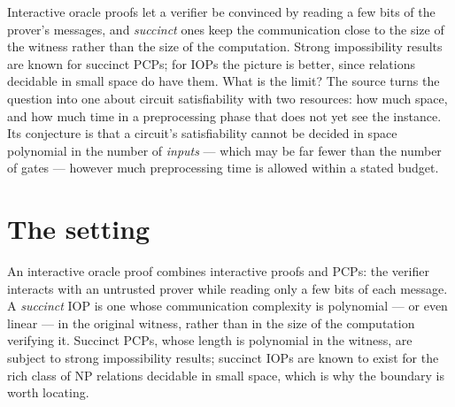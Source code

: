 \documentclass{conjura-conjecture}
\begin{document}

\vspace{0.4em}

\begin{informalconjecture}
Interactive oracle proofs let a verifier be convinced by reading a few
bits of the prover's messages, and \emph{succinct} ones keep the
communication close to the size of the witness rather than the size of
the computation. Strong impossibility results are known for succinct
PCPs; for IOPs the picture is better, since relations decidable in small
space do have them. What is the limit? The source turns the question into
one about circuit satisfiability with two resources: how much space, and
how much time in a preprocessing phase that does not yet see the
instance. Its conjecture is that a circuit's satisfiability cannot be
decided in space polynomial in the number of \emph{inputs} --- which may be
far fewer than the number of gates --- however much preprocessing time is
allowed within a stated budget.
\end{informalconjecture}

\section{The setting}\label{sec:setting}

An interactive oracle proof combines interactive proofs and PCPs: the
verifier interacts with an untrusted prover while reading only a few bits
of each message. A \emph{succinct} IOP is one whose communication
complexity is polynomial --- or even linear --- in the original witness,
rather than in the size of the computation verifying it. Succinct PCPs,
whose length is polynomial in the witness, are subject to strong
impossibility results; succinct IOPs are known to exist for the rich
class of NP relations decidable in small space, which is why the
boundary is worth locating.
\end{document}
